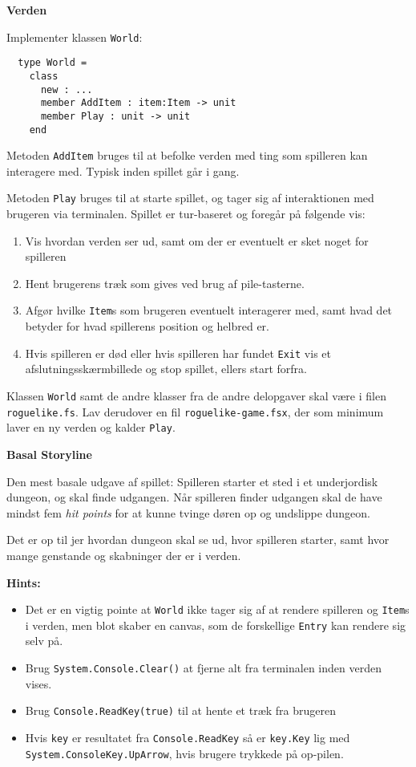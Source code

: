 \textbf{Verden}

Implementer klassen \lstinline{World}:

\begin{lstlisting}
  type World =
    class
      new : ...
      member AddItem : item:Item -> unit
      member Play : unit -> unit
    end
\end{lstlisting}

Metoden \lstinline{AddItem} bruges til at befolke verden med ting som spilleren
kan interagere med. Typisk inden spillet går i gang.

Metoden \lstinline{Play} bruges til at starte spillet, og tager sig af
interaktionen med brugeren via terminalen. Spillet er tur-baseret og
foregår på følgende vis:
\begin{enumerate}
\item Vis hvordan verden ser ud, samt om der er eventuelt er sket
  noget for spilleren
\item Hent brugerens træk som gives ved brug af pile-tasterne.
\item Afgør hvilke \lstinline{Item}s som brugeren eventuelt interagerer med,
  samt hvad det betyder for hvad spillerens position og helbred er.
\item Hvis spilleren er død eller hvis spilleren har fundet
  \lstinline{Exit} vis et afslutningsskærmbillede og stop
  spillet, ellers start forfra.
\end{enumerate}

Klassen \lstinline{World} samt de andre klasser fra de andre
delopgaver skal være i filen \texttt{roguelike.fs}. Lav derudover en
fil \texttt{roguelike-game.fsx}, der som minimum laver en ny verden og
kalder \lstinline{Play}.


\textbf{Basal Storyline}

Den mest basale udgave af spillet: Spilleren starter et sted i et
underjordisk dungeon, og skal finde udgangen. Når spilleren finder
udgangen skal de have mindst fem \emph{hit points} for at kunne tvinge
døren op og undslippe dungeon.

Det er op til jer hvordan dungeon skal se ud, hvor spilleren starter,
samt hvor mange genstande og skabninger der er i verden.


\textbf{Hints:}
\begin{itemize}
\item Det er en vigtig pointe at \lstinline{World} ikke tager sig af
  at rendere spilleren og \lstinline{Item}s i verden, men blot skaber
  en canvas, som de forskellige \lstinline{Entry} kan rendere sig selv
  på.
\item Brug \lstinline{System.Console.Clear()} at fjerne alt fra terminalen inden
  verden vises.
\item Brug \lstinline{Console.ReadKey(true)} til at hente et træk fra brugeren
\item Hvis \lstinline{key} er resultatet fra \lstinline{Console.ReadKey} så er \lstinline{key.Key}
  lig med \lstinline{System.ConsoleKey.UpArrow}, hvis brugere trykkede på
  op-pilen.
\end{itemize}





